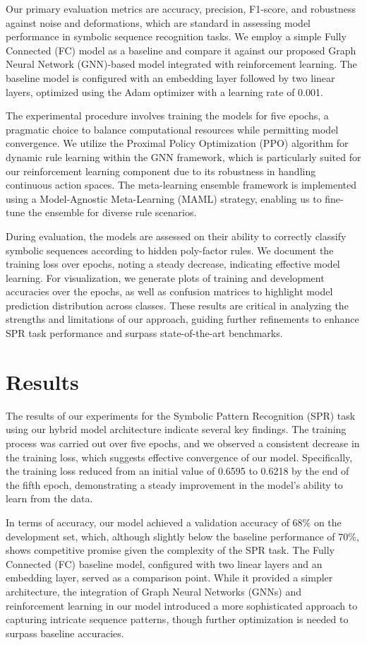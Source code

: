 \documentclass{article}
\begin{document}
Our primary evaluation metrics are accuracy, precision, F1-score, and robustness against noise and deformations, which are standard in assessing model performance in symbolic sequence recognition tasks. We employ a simple Fully Connected (FC) model as a baseline and compare it against our proposed Graph Neural Network (GNN)-based model integrated with reinforcement learning. The baseline model is configured with an embedding layer followed by two linear layers, optimized using the Adam optimizer with a learning rate of 0.001.

The experimental procedure involves training the models for five epochs, a pragmatic choice to balance computational resources while permitting model convergence. We utilize the Proximal Policy Optimization (PPO) algorithm for dynamic rule learning within the GNN framework, which is particularly suited for our reinforcement learning component due to its robustness in handling continuous action spaces. The meta-learning ensemble framework is implemented using a Model-Agnostic Meta-Learning (MAML) strategy, enabling us to fine-tune the ensemble for diverse rule scenarios.

During evaluation, the models are assessed on their ability to correctly classify symbolic sequences according to hidden poly-factor rules. We document the training loss over epochs, noting a steady decrease, indicating effective model learning. For visualization, we generate plots of training and development accuracies over the epochs, as well as confusion matrices to highlight model prediction distribution across classes. These results are critical in analyzing the strengths and limitations of our approach, guiding further refinements to enhance SPR task performance and surpass state-of-the-art benchmarks.

\section{Results}
The results of our experiments for the Symbolic Pattern Recognition (SPR) task using our hybrid model architecture indicate several key findings. The training process was carried out over five epochs, and we observed a consistent decrease in the training loss, which suggests effective convergence of our model. Specifically, the training loss reduced from an initial value of 0.6595 to 0.6218 by the end of the fifth epoch, demonstrating a steady improvement in the model's ability to learn from the data.

In terms of accuracy, our model achieved a validation accuracy of 68\% on the development set, which, although slightly below the baseline performance of 70\%, shows competitive promise given the complexity of the SPR task. The Fully Connected (FC) baseline model, configured with two linear layers and an embedding layer, served as a comparison point. While it provided a simpler architecture, the integration of Graph Neural Networks (GNNs) and reinforcement learning in our model introduced a more sophisticated approach to capturing intricate sequence patterns, though further optimization is needed to surpass baseline accuracies.
\end{document}
